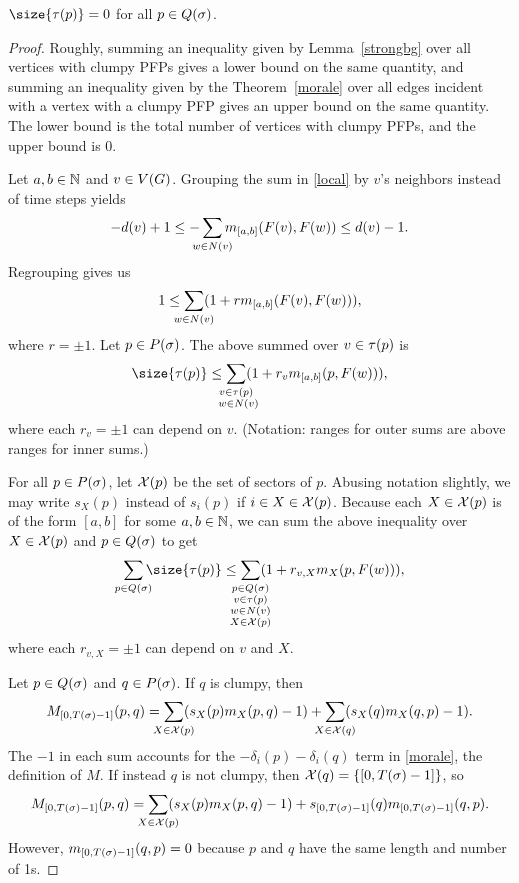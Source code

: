 \begin{thm}\label{nct}
$\size{\pfpverts{p}} = 0$ for all $p \in Q(\sigma)$.
\end{thm}

\begin{proof}
Roughly, summing an inequality given by Lemma~\ref{strongbg} over all vertices
with clumpy PFPs gives a lower bound on the same quantity, and summing an
inequality given by the Theorem~\ref{morale} over all edges incident with a
vertex with a clumpy PFP gives an upper bound on the same quantity. The lower
bound is the total number of vertices with clumpy PFPs, and the upper bound is
0.

Let $a,b \in \mathbb{N}$ and $v \in V(G)$. Grouping the sum in \eqref{local} by $v$'s
neighbors instead of time steps yields
\[
  -\deg{v} + 1 \leq -\smashoperator{\sum_{w \in
      \N{v}}}\misb{[a,b]}{\pfp{v}}{\pfp{w}} \leq \deg{v} - 1.
\]
Regrouping gives us
\[
  1 \leq \smashoperator{\sum_{w \in \N{v}}}(1 +
  r\misb{[a,b]}{\pfp{v}}{\pfp{w}}),
\]
where $r = \pm1$. Let $p \in P(\sigma)$. The above summed over $v \in \tau(p)$
is
\[
  \size{\pfpverts{p}} \leq \smashoperator{\sum_{\substack{v \in \pfpverts{p}
        \\\ w \in \N{v}}}}(1 + r_v\misb{[a,b]}{p}{\pfp{w}}),
\]
where each $r_v = \pm1$ can depend on $v$. (Notation: ranges for outer sums are
above ranges for inner sums.)

For all $p \in P(\sigma)$, let $\mathcal{X}(p)$ be the set of sectors of $p$. Abusing
notation slightly, we may write $s_X(p)$ instead of $s_i(p)$ if $i \in X \in
\mathcal{X}(p)$. Because each $X \in \mathcal{X}(p)$ is of the form $[a,b]$ for some $a,b
\in \mathbb{N}$, we can sum the above inequality over $X \in \mathcal{X}(p)$ and $p \in
Q(\sigma)$ to get
\begin{equation}\label{almost}
  \smashoperator[r]{\sum_{p \in \cpfps}}\size{\pfpverts{p}} \leq
  \smashoperator{\sum_{\substack{
        p \in \cpfps \\ v \in \pfpverts{p} \\
        w \in \N{v} \\ X \in \sctr{p}
  }}}(1 + r_{v,X}\misb{X}{p}{\pfp{w}}),
\end{equation}
where each $r_{v,X} = \pm1$ can depend on $v$ and $X$.

Let $p \in Q(\sigma)$ and $q \in P(\sigma)$. If $q$ is clumpy, then
\[
  M_{[0,\period-1]}(p,q) =
  \smashoperator{\sum_{X \in \sctr{p}}}(s_X(p)\misb{X}{p}{q} - 1) +
  \smashoperator{\sum_{X \in \sctr{q}}}(s_X(q)\misb{X}{q}{p} - 1).
\]
The $-1$ in each sum accounts for the $-\delta_i(p)-\delta_i(q)$ term in
\eqref{morale}, the definition of $M$. If instead $q$ is not clumpy, then
$\mathcal{X}(q) = \{[0,T(\sigma)-1]\}$, so
\[
  M_{[0,\period-1]}(p,q) =
  \smashoperator{\sum_{X \in \sctr{p}}}(s_X(p)\misb{X}{p}{q} - 1) +
  s_{[0,\period-1]}(q)\misb{[0,\period-1]}{q}{p}.
\]
However, $m_{[0,T(\sigma)-1]}(q,p) = 0$ because $p$ and $q$ have the same
length and number of 1s.


\end{proof}

